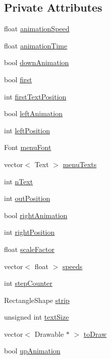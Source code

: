 \subsection*{Private Attributes}
\begin{DoxyCompactItemize}
\item 
float \hyperlink{classMenu_ac2867e5a9ffe9ddc607410485fd0f245}{animation\+Speed}
\item 
float \hyperlink{classMenu_af32e0e46edcdc1003b350e8af243628a}{animation\+Time}
\item 
bool \hyperlink{classMenu_aed34d6afbe07125d76062a534702cc96}{down\+Animation}
\item 
bool \hyperlink{classMenu_a00fb6eae49e90e2d136acc30113a586d}{first}
\item 
int \hyperlink{classMenu_ae4477bba3eedd781a216463d426ccc0d}{first\+Text\+Position}
\item 
bool \hyperlink{classMenu_a03bcd3608c9abd56b93c7ad12ee9a69e}{left\+Animation}
\item 
int \hyperlink{classMenu_ae5530fcf346921fed30a419a162b3b1e}{left\+Position}
\item 
Font \hyperlink{classMenu_a42c864293b5786e44c41825a9f58a4d0}{menu\+Font}
\item 
vector$<$ Text $>$ \hyperlink{classMenu_a1aeea0f0b6990ce000cd25a15b5580fa}{menu\+Texts}
\item 
int \hyperlink{classMenu_af12ee21ad6f9d7f3da9573097eca8a84}{n\+Text}
\item 
int \hyperlink{classMenu_ae88d145e5fa875757702b497f0fc41c5}{out\+Position}
\item 
bool \hyperlink{classMenu_a8ce63316e4f8a2c57ca89e377ea7bb7d}{right\+Animation}
\item 
int \hyperlink{classMenu_ac164eee1fb3453d836d53eb59686ac32}{right\+Position}
\item 
float \hyperlink{classMenu_a3edde1cae9d582ce1521009d1744068d}{scale\+Factor}
\item 
vector$<$ float $>$ \hyperlink{classMenu_aca5731572596b8e5dbd962b41644ae27}{speeds}
\item 
int \hyperlink{classMenu_a7fc5cd2396e512ef71bb7c3d367710d7}{step\+Counter}
\item 
Rectangle\+Shape \hyperlink{classMenu_a56e4febfec0254757193602cabcb88e1}{strip}
\item 
unsigned int \hyperlink{classMenu_af50094c0a9831c625dc16a713652777c}{text\+Size}
\item 
vector$<$ Drawable $\ast$ $>$ \hyperlink{classMenu_ad64e0b08c47706709d3b23a61caf036f}{to\+Draw}
\item 
bool \hyperlink{classMenu_add7681941b1c69a7ffd83838dfd0b308}{up\+Animation}
\end{DoxyCompactItemize}


